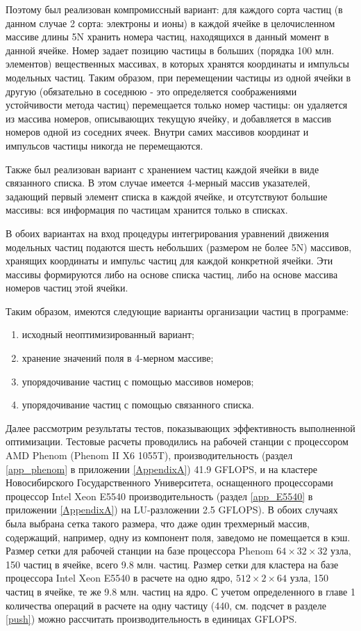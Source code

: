 Поэтому был реализован компромиссный вариант: для каждого сорта частиц (в данном случае 2 сорта: электроны и ионы) в каждой ячейке в целочисленном массиве длины 5N хранить номера частиц, находящихся в данный момент в данной ячейке. Номер задает позицию частицы в больших (порядка 100 млн. элементов) вещественных массивах, в которых хранятся координаты и импульсы модельных частиц. Таким образом, при перемещении частицы из одной ячейки в другую (обязательно в соседнюю - это определяется соображениями устойчивости метода частиц) перемещается только номер частицы: он удаляется из массива номеров, описывающих текущую ячейку, и добавляется в массив номеров одной из соседних ячеек. Внутри самих массивов координат и импульсов частицы никогда не перемещаются. 

Также был реализован вариант с хранением частиц каждой ячейки в виде связанного списка. В этом случае имеется 4-мерный массив указателей, задающий первый элемент списка в каждой ячейке, и отсутствуют большие массивы: вся информация по частицам хранится только в списках. 

В обоих вариантах на вход процедуры интегрирования уравнений движения модельных частиц подаются шесть небольших (размером не более 5N) массивов, хранящих координаты и импульс частиц для каждой конкретной ячейки. Эти массивы формируются либо на основе списка частиц, либо на основе массива номеров частиц этой ячейки. 

Таким образом, имеются следующие варианты организации частиц в программе:
\begin{enumerate}
	\item исходный неоптимизированный вариант; 
	\item хранение значений поля в 4-мерном массиве; 
	\item упорядочивание частиц с помощью массивов номеров; 
	\item упорядочивание частиц с помощью связанного списка. 
\end{enumerate}

Далее рассмотрим результаты тестов, показывающих эффективность выполненной оптимизации. Тестовые расчеты проводились на рабочей станции с процессором AMD Phenom (Phenom II X6 1055T),  производительность (раздел  \ref{app_phenom} в приложении \ref{AppendixA}) 41.9 GFLOPS, и на кластере Новосибирского Государственного Университета, оснащенного процессорами процессор Intel Xeon  E5540 производительность (раздел \ref{app_E5540} в приложении \ref{AppendixA}) на LU-разложении 2.5 GFLOPS). В обоих случаях была выбрана сетка такого размера, что даже один трехмерный массив, содержащий, например, одну из компонент поля, заведомо не помещается в кэш. 
Размер сетки для рабочей станции на базе процессора Phenom  $64\times32\times32$ узла, 150 частиц в ячейке, всего 9.8 млн. частиц. Размер сетки для кластера на базе процессора Intel Xeon  E5540 в расчете на одно ядро, $512\times2\times64$ узла, 150 частиц в ячейке, те же 9.8 млн. частиц на ядро. С учетом определенного в главе 1 количества операций в расчете на одну частицу (440, см. подсчет в разделе \ref{push}) можно рассчитать производительность в единицах GFLOPS.

